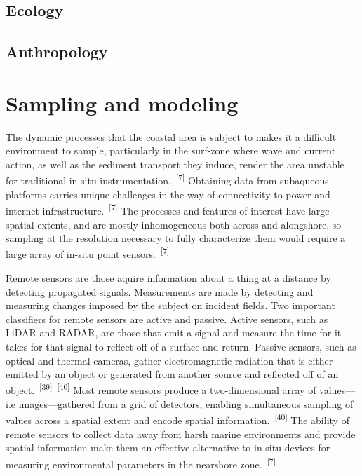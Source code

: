 \documentclass{article}
\begin{document}

\subsection{Ecology}

\subsection{Anthropology}

\section{Sampling and modeling}

\par{The dynamic processes that the coastal area is subject to makes it a difficult environment to sample, particularly in the surf-zone where wave and current action, as well as the sediment transport they induce, render the area unstable for traditional in-situ instrumentation.~\textsuperscript{[7]} Obtaining data from subaqueous platforms carries unique challenges in the way of connectivity to power and internet infrastructure.~\textsuperscript{[7]} The processes and features of interest have large spatial extents, and are mostly inhomogeneous both across and alongshore, so sampling at the resolution necessary to fully characterize them would require a large array of in-situ point sensors.~\textsuperscript{[7]}}

\par{Remote sensors are those aquire information about a thing at a distance by detecting propagated signals. Measurements are made by detecting and measuring changes imposed by the subject on incident fields. Two important classifiers for remote sensors are active and passive. Active sensors, such as LiDAR and RADAR, are those that emit a signal and measure the time for it takes for that signal to reflect off of a surface and return. Passive sensors, such as optical and thermal cameras, gather electromagnetic radiation that is either emitted by an object or generated from another source and reflected off of an object.~\textsuperscript{[39]}~\textsuperscript{[40]} Most remote sensors produce a two-dimensional array of values---i.e images---gathered from a grid of detectors, enabling simultaneous sampling of values across a spatial extent and encode spatial information.~\textsuperscript{[40]} The ability of remote sensors to collect data away from harsh marine environments and provide spatial information make them an effective alternative to in-situ devices for measuring environmental parameters in the nearshore zone.~\textsuperscript{[7]}}
\end{document}
